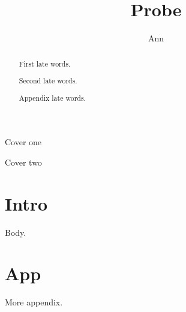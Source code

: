 \documentclass{article}
\begin{document}
\title{Probe}\author{Ann}
\maketitle
\begin{center}Cover one\end{center}
\begin{abstract}First late words.\end{abstract}
\begin{center}Cover two\end{center}
\begin{abstract}Second late words.\end{abstract}
\section{Intro}
Body.
\appendix
\section{App}
\begin{abstract}Appendix late words.\end{abstract}
More appendix.
\end{document}
